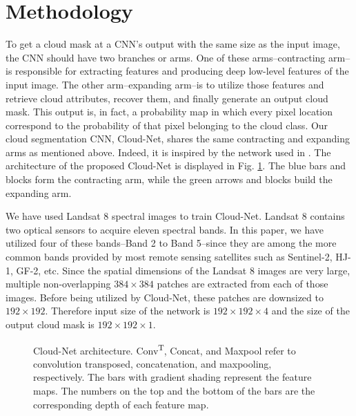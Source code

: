 \documentclass{article}
\begin{document}
\section{Methodology}
\label{sec:format}
To get a cloud mask at a CNN's output with the same size as the input image, the CNN should have two branches or arms. One of these arms--contracting arm--is responsible for extracting features and producing deep low-level features of the input image. The other arm--expanding arm--is to utilize those features and retrieve cloud attributes, recover them, and finally generate an output cloud mask. This output is, in fact, a probability map in which every pixel location correspond to the probability of that pixel belonging to the cloud class. Our cloud segmentation CNN, Cloud-Net, shares the same contracting and expanding arms as mentioned above. Indeed, it is inspired by the network used in \cite{mymmsp_shadow}. The architecture of the proposed Cloud-Net is displayed in Fig. \ref{fig:arch}. The blue bars and blocks form the contracting arm, while the green arrows and blocks build the expanding arm.

We have used Landsat 8 spectral images to train Cloud-Net. Landsat 8 contains two optical sensors to acquire eleven spectral bands. In this paper, we have utilized four of these bands--Band 2 to Band 5--since they are among the more common bands provided by most remote sensing satellites such as Sentinel-2, HJ-1, GF-2, etc. Since the spatial dimensions of the Landsat 8 images are very large, multiple non-overlapping $384\times 384$ patches are extracted from each of those images. Before being utilized by Cloud-Net, these patches are downsized to $192\times 192$. Therefore input size of the network is $192\times 192\times 4$ and the size of the output cloud mask is $192\times 192\times 1$.

\begin{figure}[t]
\begin{minipage}[b]{1.0\linewidth}
  \centering
  \centerline{}
\end{minipage}
\caption{\footnotesize Cloud-Net architecture. Conv\textsuperscript{T}, Concat, and Maxpool refer to convolution transposed, concatenation, and maxpooling, respectively. The bars with gradient shading represent the feature maps. The numbers on the top and the bottom of the bars are the corresponding depth of each feature map.}
\label{fig:arch}
\vspace{-4mm}
\end{figure}
\end{document}
